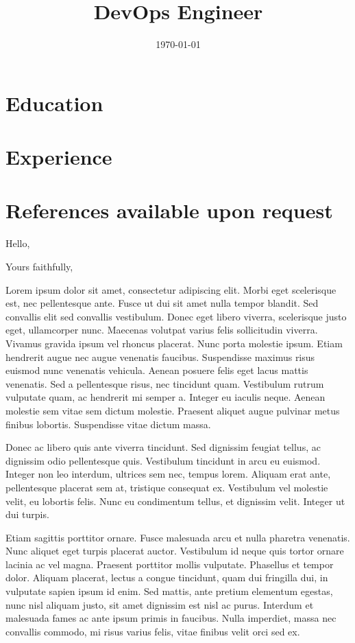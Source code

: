 \documentclass[11pt,a4paper,sans]{moderncv}
\title{DevOps Engineer}
\begin{document}
\makecvtitle

\section{Education}

\section{Experience}

\section{References available upon request}

\clearpage


\date{\today}
\opening{Hello,}
\closing{Yours faithfully,}
\makelettertitle


Lorem ipsum dolor sit amet, consectetur adipiscing elit. Morbi eget scelerisque
est, nec pellentesque ante. Fusce ut dui sit amet nulla tempor blandit. Sed
convallis elit sed convallis vestibulum. Donec eget libero viverra, scelerisque
justo eget, ullamcorper nunc. Maecenas volutpat varius felis sollicitudin
viverra. Vivamus gravida ipsum vel rhoncus placerat. Nunc porta molestie ipsum.
Etiam hendrerit augue nec augue venenatis faucibus. Suspendisse maximus risus
euismod nunc venenatis vehicula. Aenean posuere felis eget lacus mattis
venenatis. Sed a pellentesque risus, nec tincidunt quam. Vestibulum rutrum
vulputate quam, ac hendrerit mi semper a. Integer eu iaculis neque. Aenean
molestie sem vitae sem dictum molestie. Praesent aliquet augue pulvinar metus
finibus lobortis. Suspendisse vitae dictum massa.

Donec ac libero quis ante viverra tincidunt. Sed dignissim feugiat tellus, ac
dignissim odio pellentesque quis. Vestibulum tincidunt in arcu eu euismod.
Integer non leo interdum, ultrices sem nec, tempus lorem. Aliquam erat ante,
pellentesque placerat sem at, tristique consequat ex. Vestibulum vel molestie
velit, eu lobortis felis. Nunc eu condimentum tellus, et dignissim velit.
Integer ut dui turpis.

Etiam sagittis porttitor ornare. Fusce malesuada arcu et nulla pharetra
venenatis. Nunc aliquet eget turpis placerat auctor. Vestibulum id neque quis
tortor ornare lacinia ac vel magna. Praesent porttitor mollis vulputate.
Phasellus et tempor dolor. Aliquam placerat, lectus a congue tincidunt, quam dui
fringilla dui, in vulputate sapien ipsum id enim. Sed mattis, ante pretium
elementum egestas, nunc nisl aliquam justo, sit amet dignissim est nisl ac
purus. Interdum et malesuada fames ac ante ipsum primis in faucibus. Nulla
imperdiet, massa nec convallis commodo, mi risus varius felis, vitae finibus
velit orci sed ex.

\makeletterclosing
\end{document}
